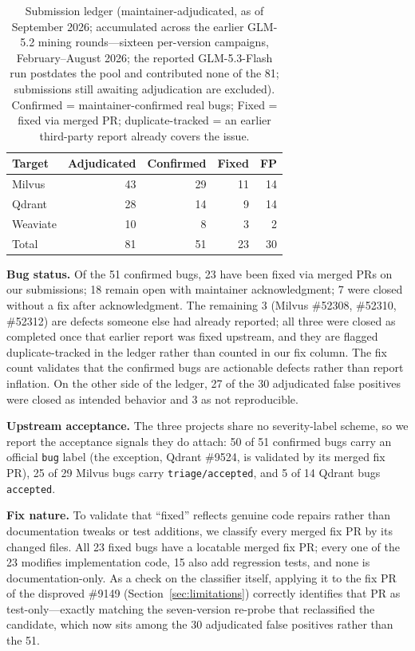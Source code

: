 \documentclass[acmsmall,screen,review,anonymous]{acmart}
\begin{document}
\begin{table}[t]
\caption{Submission ledger (maintainer-adjudicated, as of September 2026; accumulated across the earlier GLM-5.2 mining rounds---sixteen per-version campaigns, February--August 2026; the reported GLM-5.3-Flash run postdates the pool and contributed none of the 81; submissions still awaiting adjudication are excluded). Confirmed = maintainer-confirmed real bugs; Fixed = fixed via merged PR; duplicate-tracked = an earlier third-party report already covers the issue.}
\label{tab:yield}
\small
\begin{tabular}{@{}lrrrr@{}}
\toprule
Target & Adjudicated & Confirmed & Fixed & FP \\
\midrule
Milvus & 43 & 29 & 11 & 14 \\
Qdrant & 28 & 14 & 9 & 14 \\
Weaviate & 10 & 8 & 3 & 2 \\
\midrule
Total & 81 & 51 & 23 & 30 \\
\bottomrule
\end{tabular}
\end{table}

\textbf{Bug status.} Of the 51 confirmed bugs, 23 have been fixed via merged PRs on our submissions; 18 remain open with maintainer acknowledgment; 7 were closed without a fix after acknowledgment. The remaining 3 (Milvus \#52308, \#52310, \#52312) are defects someone else had already reported; all three were closed as completed once that earlier report was fixed upstream, and they are flagged duplicate-tracked in the ledger rather than counted in our fix column. The fix count validates that the confirmed bugs are actionable defects rather than report inflation. On the other side of the ledger, 27 of the 30 adjudicated false positives were closed as intended behavior and 3 as not reproducible.

\textbf{Upstream acceptance.} The three projects share no severity-label scheme, so we report the acceptance signals they do attach: 50 of 51 confirmed bugs carry an official \texttt{bug} label (the exception, Qdrant \#9524, is validated by its merged fix PR), 25 of 29 Milvus bugs carry \texttt{triage/accepted}, and 5 of 14 Qdrant bugs \texttt{accepted}.

\textbf{Fix nature.} To validate that ``fixed'' reflects genuine code repairs rather than documentation tweaks or test additions, we classify every merged fix PR by its changed files. All 23 fixed bugs have a locatable merged fix PR; every one of the 23 modifies implementation code, 15 also add regression tests, and none is documentation-only. As a check on the classifier itself, applying it to the fix PR of the disproved \#9149 (Section~\ref{sec:limitations}) correctly identifies that PR as test-only---exactly matching the seven-version re-probe that reclassified the candidate, which now sits among the 30 adjudicated false positives rather than the 51.
\end{document}
